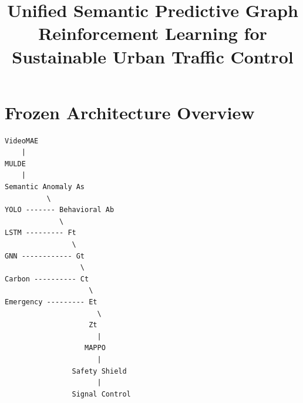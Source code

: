 \documentclass{article}
\title{Unified Semantic Predictive Graph Reinforcement Learning for Sustainable Urban Traffic Control}
\begin{document}
\maketitle

\begin{abstract}
\end{abstract}

\section{Frozen Architecture Overview}
\begin{verbatim}
VideoMAE
    |
MULDE
    |
Semantic Anomaly As
          \
YOLO ------- Behavioral Ab
             \
LSTM --------- Ft
                \
GNN ------------ Gt
                  \
Carbon ---------- Ct
                    \
Emergency --------- Et
                      \
                    Zt
                      |
                   MAPPO
                      |
                Safety Shield
                      |
                Signal Control
\end{verbatim}
\end{document}
